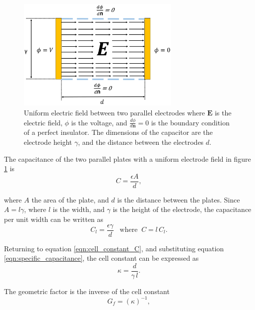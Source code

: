    \begin{figure}[ht]
  \centering
  \includegraphics[width=0.7\textwidth]{images/capacitorNoFringe.png}
  \caption[Uniform electric field between parallel plates]{Uniform electric field between two parallel electrodes where $\boldsymbol{E}$ is the electric field, $\phi$ is the voltage, and $\frac{d\phi}{d\boldsymbol{n}}=0$ is the boundary condition of a perfect insulator. The dimensions of the capacitor are the electrode height $\gamma$, and the distance between the electrodes $d$.}
  \label{fig:parallel_capacitor}
  \end{figure}
  
  \par The capacitance of the two parallel plates with a uniform electrode field in figure \ref{fig:parallel_capacitor} is
  \begin{equation}
      C = \frac{\epsilon A}{d},
      \label{eqn:capacitor}
  \end{equation}
  
  \noindent where $A$ the area of the plate, and $d$ is the distance between the plates. Since $A = l\gamma$, where $l$ is the width, and $\gamma$ is the height of the electrode, the capacitance per unit width can be written as
  \begin{equation}
      C_l = \frac{\epsilon\gamma}{d} \;\;\;\text{where} \;\; C =l\, C_l.
      \label{eqn:specific_capacitance}
  \end{equation}
  
  \par Returning to equation \ref{eqn:cell_constant_C}, and substituting equation \ref{eqn:specific_capacitance}, the cell constant can be expressed as 
  \begin{equation}
      \kappa = \frac{d}{\gamma \, l}.
      \label{eqn:cell_constant}
  \end{equation}
  
  \noindent The geometric factor is the inverse of the cell constant
  \begin{equation}
       G_f = (\kappa)^{-1},
       \label{geometric_cell}
  \end{equation}

